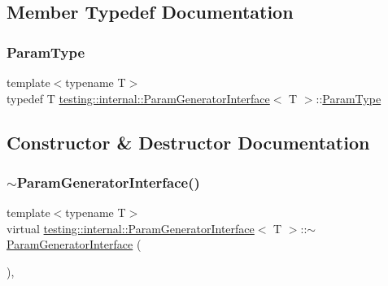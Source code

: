 \subsection{Member Typedef Documentation}
\mbox{\label{classtesting_1_1internal_1_1ParamGeneratorInterface_ab33d2ea424c50beaf503cb125b3cd003}} 
\subsubsection{\texorpdfstring{Param\+Type}{ParamType}}
{\footnotesize\ttfamily template$<$typename T$>$ \\
typedef T \hyperlink{classtesting_1_1internal_1_1ParamGeneratorInterface}{testing\+::internal\+::\+Param\+Generator\+Interface}$<$ T $>$\+::\hyperlink{classtesting_1_1internal_1_1ParamGeneratorInterface_ab33d2ea424c50beaf503cb125b3cd003}{Param\+Type}}



\subsection{Constructor \& Destructor Documentation}
\mbox{\label{classtesting_1_1internal_1_1ParamGeneratorInterface_ac2767cb9ad2e292e291c4903323c6eff}} 
\subsubsection{\texorpdfstring{$\sim$\+Param\+Generator\+Interface()}{~ParamGeneratorInterface()}}
{\footnotesize\ttfamily template$<$typename T$>$ \\
virtual \hyperlink{classtesting_1_1internal_1_1ParamGeneratorInterface}{testing\+::internal\+::\+Param\+Generator\+Interface}$<$ T $>$\+::$\sim$\hyperlink{classtesting_1_1internal_1_1ParamGeneratorInterface}{Param\+Generator\+Interface} (\begin{DoxyParamCaption}{ }\end{DoxyParamCaption})\hspace{0.3cm}{\ttfamily [inline]}, {\ttfamily [virtual]}}



